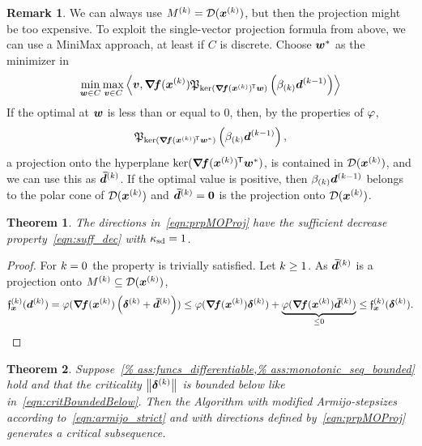 \documentclass{article}
\theoremstyle{plain}
\newtheorem{theorem}{Theorem}
\theoremstyle{definition}
\newtheorem*{remark*}{Remark}
\begin{document}
\begin{remark*}
We can always use $M^{(k)} = \mathcal D(\bm{x}^{(k)})$, but then the projection
might be too expensive.
To exploit the single-vector projection formula from above, 
we can use a MiniMax approach, at least if $C$ is discrete.
Choose $\bm{w}^*$ as the minimizer in
$$
\min_{\bm{w}\in C}
\max_{\bm{v}\in C}
\left\langle 
	\bm{v}, 
	\bm{\nabla}\!\bm{f}(\bm{x}^{(k)})\mathfrak P_{\operatorname*{ker}(\bm{\nabla}\!\bm{f}(\bm{x}^{(k)})^{\mkern-1.5mu\mathsf{T}}\bm{w})}\left(\beta_{(k)} \bm{d}^{(k-1)}\right)
 \right\rangle
$$
If the optimal at $\bm{w}$ is less than or equal to $0$,
then, by the properties of $\varphi$,
$$
\mathfrak P_{\operatorname*{ker}(\bm{\nabla}\!\bm{f}(\bm{x}^{(k)})^{\mkern-1.5mu\mathsf{T}}\bm{w}^*)}\left(\beta_{(k)} \bm{d}^{(k-1)}\right),
$$
a projection onto the hyperplane $\operatorname*{ker}(\bm{\nabla}\!\bm{f}(\bm{x}^{(k)})^{\mkern-1.5mu\mathsf{T}}\bm{w}^*)$,
is contained in $\mathcal D(\bm{x}^{(k)})$, and
we can use this as $\bm{\bar{d}}^{(k)}$.
If the optimal value is positive, then $\beta_{(k)}\bm{d}^{(k-1)}$ belongs to
the polar cone of $\mathcal D(\bm{x}^{(k)})$ and $\bm{\bar{d}}^{(k)} = \bm{0}$
is the projection onto $\mathcal D(\bm{x}^{(k)})$.
\end{remark*}

\begin{theorem}
The directions in~\eqref{eqn:prpMOProj} have the 
sufficient decrease property~\eqref{eqn:suff_dec}
with $\kappa_{\mathrm{sd}} = 1$.
\end{theorem}
\begin{proof}
For $k=0$ the property is trivially satisfied.
Let $k\geq 1$.
As $\bm{\bar{d}}^{(k)}$ is a projection onto $M^{(k)}\subseteq \mathcal D(\bm{x}^{(k)})$,
\begin{align*}
	\mathfrak{f}_{\bm{x}}^{(k)}(\bm{d}^{(k)})
	=
	\varphi(\bm{\nabla}\!\bm{f}(\bm{x}^{(k)})\left(\bm{\delta}^{(k)} + \bm{\bar{d}}^{(k)}\right))
	\leq
	\varphi(\bm{\nabla}\!\bm{f}(\bm{x}^{(k)})\bm{\delta}^{(k)})
	+ 
	\underbrace{\varphi(\bm{\nabla}\!\bm{f}(\bm{x}^{(k)})\bm{\bar{d}}^{(k)})}_{\leq 0}
	\leq 
	\mathfrak{f}_{\bm{x}}^{(k)}(\bm{\delta}^{(k)}).
\end{align*}
\end{proof}

\begin{theorem}
	Suppose~\cref{%
	ass:funcs_differentiable,%
	ass:monotonic_seq_bounded}
	hold and that the criticality $\left\|\bm{\delta}^{(k)}\right\|$ is 
	bounded below like in~\eqref{eqn:critBoundedBelow}.
	Then the Algorithm with modified Armijo-stepsizes
	according to~\eqref{eqn:armijo_strict} and with directions defined
	by~\eqref{eqn:prpMOProj} generates a critical subsequence.
\end{theorem}
\end{document}
